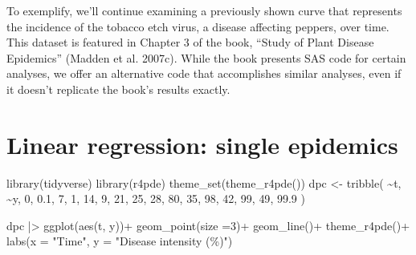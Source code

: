 \documentclass[
  letterpaper,
]{book}
\newenvironment{Shaded}{\begin{snugshade}}{\end{snugshade}}
\newcommand{\AttributeTok}[1]{\textcolor[rgb]{0.40,0.45,0.13}{#1}}
\newcommand{\DecValTok}[1]{\textcolor[rgb]{0.68,0.00,0.00}{#1}}
\newcommand{\FloatTok}[1]{\textcolor[rgb]{0.68,0.00,0.00}{#1}}
\newcommand{\FunctionTok}[1]{\textcolor[rgb]{0.28,0.35,0.67}{#1}}
\newcommand{\NormalTok}[1]{\textcolor[rgb]{0.00,0.23,0.31}{#1}}
\newcommand{\OtherTok}[1]{\textcolor[rgb]{0.00,0.23,0.31}{#1}}
\newcommand{\SpecialCharTok}[1]{\textcolor[rgb]{0.37,0.37,0.37}{#1}}
\newcommand{\StringTok}[1]{\textcolor[rgb]{0.13,0.47,0.30}{#1}}
\begin{document}
To exemplify, we'll continue examining a previously shown curve that
represents the incidence of the tobacco etch virus, a disease affecting
peppers, over time. This dataset is featured in Chapter 3 of the book,
``Study of Plant Disease Epidemics'' (Madden et al. 2007c). While the
book presents SAS code for certain analyses, we offer an alternative
code that accomplishes similar analyses, even if it doesn't replicate
the book's results exactly.

\hypertarget{linear-regression-single-epidemics}{%
\section{Linear regression: single
epidemics}\label{linear-regression-single-epidemics}}

\begin{Shaded}
\begin{Highlighting}[]
\FunctionTok{library}\NormalTok{(tidyverse)}
\FunctionTok{library}\NormalTok{(r4pde)}
\FunctionTok{theme\_set}\NormalTok{(}\FunctionTok{theme\_r4pde}\NormalTok{())}
\NormalTok{dpc }\OtherTok{\textless{}{-}} 
  \FunctionTok{tribble}\NormalTok{(}
   \SpecialCharTok{\textasciitilde{}}\NormalTok{t,  }\SpecialCharTok{\textasciitilde{}}\NormalTok{y, }
   \DecValTok{0}\NormalTok{,  }\FloatTok{0.1}\NormalTok{, }
   \DecValTok{7}\NormalTok{,  }\DecValTok{1}\NormalTok{, }
  \DecValTok{14}\NormalTok{,  }\DecValTok{9}\NormalTok{, }
  \DecValTok{21}\NormalTok{,  }\DecValTok{25}\NormalTok{, }
  \DecValTok{28}\NormalTok{,  }\DecValTok{80}\NormalTok{, }
  \DecValTok{35}\NormalTok{, }\DecValTok{98}\NormalTok{, }
  \DecValTok{42}\NormalTok{, }\DecValTok{99}\NormalTok{, }
  \DecValTok{49}\NormalTok{, }\FloatTok{99.9}
\NormalTok{  )}
\end{Highlighting}
\end{Shaded}

\begin{Shaded}
\begin{Highlighting}[]
\NormalTok{dpc }\SpecialCharTok{|\textgreater{}} 
  \FunctionTok{ggplot}\NormalTok{(}\FunctionTok{aes}\NormalTok{(t, y))}\SpecialCharTok{+}
  \FunctionTok{geom\_point}\NormalTok{(}\AttributeTok{size =}\DecValTok{3}\NormalTok{)}\SpecialCharTok{+}
  \FunctionTok{geom\_line}\NormalTok{()}\SpecialCharTok{+}
  \FunctionTok{theme\_r4pde}\NormalTok{()}\SpecialCharTok{+}
  \FunctionTok{labs}\NormalTok{(}\AttributeTok{x =} \StringTok{"Time"}\NormalTok{, }\AttributeTok{y =} \StringTok{"Disease intensity (\%)"}\NormalTok{)}
\end{Highlighting}
\end{Shaded}
\end{document}
